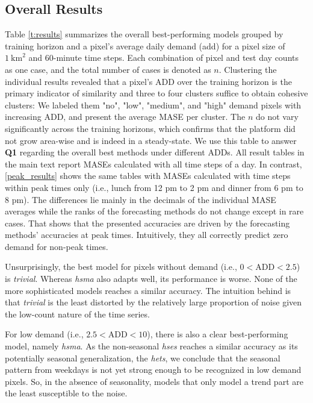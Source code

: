 \subsection{Overall Results}
\label{overall_results}

Table \ref{t:results} summarizes the overall best-performing models grouped by
    training horizon and a pixel's average daily demand (\gls{add}) for a
    pixel size of $1~\text{km}^2$ and 60-minute time steps.
Each combination of pixel and test day counts as one case, and the total
    number of cases is denoted as $n$.
Clustering the individual results revealed that a pixel's ADD over the
    training horizon is the primary indicator of similarity and three to four
    clusters suffice to obtain cohesive clusters:
We labeled them "no", "low", "medium", and "high" demand pixels with
    increasing ADD, and present the average MASE per cluster.
The $n$ do not vary significantly across the training horizons, which confirms
    that the platform did not grow area-wise and is indeed in a steady-state.
We use this table to answer \textbf{Q1} regarding the overall best methods
    under different ADDs.
All result tables in the main text report MASEs calculated with all time
    steps of a day.
In contrast, \ref{peak_results} shows the same tables with MASEs calculated
    with time steps within peak times only (i.e., lunch from 12 pm to 2 pm and
    dinner from 6 pm to 8 pm).
The differences lie mainly in the decimals of the individual MASE
    averages while the ranks of the forecasting methods do not change except
    in rare cases.
That shows that the presented accuracies are driven by the forecasting methods'
    accuracies at peak times.
Intuitively, they all correctly predict zero demand for non-peak times.
 
Unsurprisingly, the best model for pixels without demand (i.e.,
    $0 < \text{ADD} < 2.5$) is \textit{trivial}.
Whereas \textit{hsma} also adapts well, its performance is worse.
None of the more sophisticated models reaches a similar accuracy.
The intuition behind is that \textit{trivial} is the least distorted by the
    relatively large proportion of noise given the low-count nature of the
    time series.

For low demand (i.e., $2.5 < \text{ADD} < 10$), there is also a clear
    best-performing model, namely \textit{hsma}.
As the non-seasonal \textit{hses} reaches a similar accuracy as its
    potentially seasonal generalization, the \textit{hets}, we conclude that
    the seasonal pattern from weekdays is not yet strong enough to be
    recognized in low demand pixels.
So, in the absence of seasonality, models that only model a trend part are
    the least susceptible to the noise.

